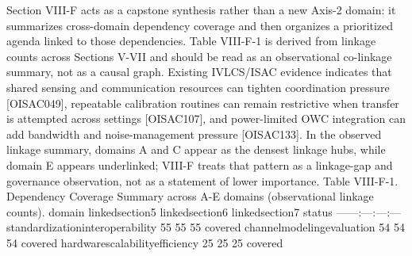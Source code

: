 \markdownRendererInterblockSeparator
{}Section VIII-F acts as a capstone synthesis rather than a new Axis-2 domain: it summarizes cross-domain dependency coverage and then organizes a prioritized agenda linked to those dependencies. Table VIII-F-1 is derived from linkage counts across Sections V-VII and should be read as an observational co-linkage summary, not as a causal graph. Existing IVLCS/ISAC evidence indicates that shared sensing and communication resources can tighten coordination pressure [O\markdownRendererUnderscore{}ISAC\markdownRendererUnderscore{}049], repeatable calibration routines can remain restrictive when transfer is attempted across settings [O\markdownRendererUnderscore{}ISAC\markdownRendererUnderscore{}107], and power-limited OWC integration can add bandwidth and noise-management pressure [O\markdownRendererUnderscore{}ISAC\markdownRendererUnderscore{}133]. In the observed linkage summary, domains A and C appear as the densest linkage hubs, while domain E appears underlinked; VIII-F treats that pattern as a linkage-gap and governance observation, not as a statement of lower importance.\markdownRendererParagraphSeparator
{}Table VIII-F-1. Dependency Coverage Summary across A-E domains (observational linkage counts).\markdownRendererParagraphSeparator
{}\markdownRendererPipe{} domain \markdownRendererPipe{} linked\markdownRendererUnderscore{}section5 \markdownRendererPipe{} linked\markdownRendererUnderscore{}section6 \markdownRendererPipe{} linked\markdownRendererUnderscore{}section7 \markdownRendererPipe{} status \markdownRendererPipe{}\markdownRendererSoftLineBreak
{}\markdownRendererPipe{}---\markdownRendererPipe{}---:\markdownRendererPipe{}---:\markdownRendererPipe{}---:\markdownRendererPipe{}---\markdownRendererPipe{}\markdownRendererSoftLineBreak
{}\markdownRendererPipe{} standardization\markdownRendererUnderscore{}interoperability \markdownRendererPipe{} 55 \markdownRendererPipe{} 55 \markdownRendererPipe{} 55 \markdownRendererPipe{} covered \markdownRendererPipe{}\markdownRendererSoftLineBreak
{}\markdownRendererPipe{} channel\markdownRendererUnderscore{}modeling\markdownRendererUnderscore{}evaluation \markdownRendererPipe{} 54 \markdownRendererPipe{} 54 \markdownRendererPipe{} 54 \markdownRendererPipe{} covered \markdownRendererPipe{}\markdownRendererSoftLineBreak
{}\markdownRendererPipe{} hardware\markdownRendererUnderscore{}scalability\markdownRendererUnderscore{}efficiency \markdownRendererPipe{} 25 \markdownRendererPipe{} 25 \markdownRendererPipe{} 25 \markdownRendererPipe{} covered \markdownRendererPipe{}\markdownRendererSoftLineBreak
